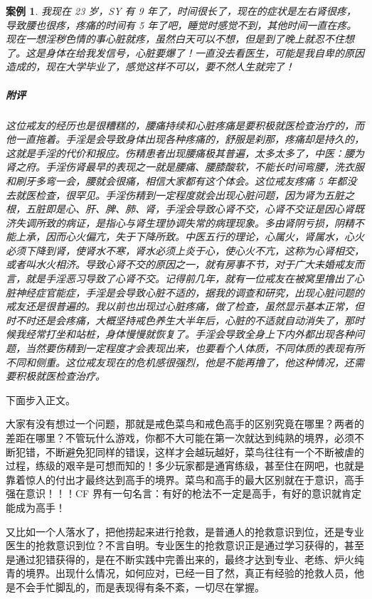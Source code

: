 \documentclass{ctexart}
\newtheorem{case}{案例}
\begin{document}
\begin{case}
    我现在 23 岁，SY 有 9 年了，时间很长了，现在的症状是左右肾很疼，导致腰也很疼，疼痛的时间有 5 年了吧，睡觉时感觉不到，其他时间一直在疼。现在一想淫秽色情的事心脏就疼，虽然白天可以不想，但是到了晚上就忍不住想了。这是身体在给我发信号，心脏要爆了！一直没去看医生，可能是我自卑的原因造成的，现在大学毕业了，感觉这样不可以，要不然人生就完了！
    \subparagraph{附评} 这位戒友的经历也是很糟糕的，腰痛持续和心脏疼痛是要积极就医检查治疗的，而他一直拖着。手淫是会导致身体出现各种疼痛的，舒服是刹那，疼痛却是持久的，这就是手淫的代价和报应。伤精患者出现腰痛极其普遍，太多太多了，中医：腰为肾之府。手淫伤肾最早的表现之一就是腰痛、腰膝酸软，不能长时间弯腰，洗衣服和刷牙多弯一会，腰就会很痛，相信大家都有这个体会。这位戒友疼痛 5 年都没去就医检查，很罕见。手淫伤精到一定程度就会出现心脏问题，因为肾为五脏之根，五脏即是心、肝、脾、肺、肾，手淫会导致心肾不交，心肾不交证是因心肾既济失调所致的病证，是指心与肾生理协调失常的病理现象。多由肾阴亏损，阴精不能上承，因而心火偏亢，失于下降所致。中医五行的理论，心属火，肾属水，心火必须下降到肾，使肾水不寒，肾水必须上炎于心，使心火不亢，这称为心肾相交，或者叫水火相济。导致心肾不交的原因之一，就有房事不节，对于广大未婚戒友而言，就是手淫恶习导致了心肾不交。记得前几年，就有一位戒友在被窝里撸出了心脏神经症官能症，手淫是会导致心脏不适的，据我的调查和研究，出现心脏问题的戒友还是很普遍的。我以前也出现过心脏疼痛，做了检查，虽然显示基本正常，但时不时还是会疼痛，大概坚持戒色养生大半年后，心脏的不适就自动消失了，那时候我经常打坐和站桩，身体慢慢就恢复了。手淫会导致全身上下内外都出现各种问题，当然要伤精到一定程度才会表现出来，也要看个人体质，不同体质的表现有所不同和侧重。这位戒友现在的危机感很强烈，他是不能再撸了，他这种情况，还需要积极就医检查治疗。
\end{case}

下面步入正文。

大家有没有想过一个问题，那就是戒色菜鸟和戒色高手的区别究竟在哪里？两者的差距在哪里？不管玩什么游戏，你都不大可能在第一次就达到纯熟的境界，必须不断犯错，不断避免犯同样的错误，这样才会越玩越好，菜鸟往往有一个不断被虐的过程，练级的艰辛是可想而知的！多少玩家都是通宵练级，甚至住在网吧，也就是靠着惊人的付出才最终达到高手的境界。菜鸟和高手的最大区别就在于意识，高手强在意识！！！CF 界有一句名言：有好的枪法不一定是高手，有好的意识就肯定能成为高手！

又比如一个人落水了，把他捞起来进行抢救，是普通人的抢救意识到位，还是专业医生的抢救意识到位？不言自明。专业医生的抢救意识正是通过学习获得的，甚至是通过犯错获得的，是在不断实践中完善出来的，最终才达到专业、老练、炉火纯青的境界。出现什么情况，如何应对，已经一目了然，真正有经验的抢救人员，他是不会手忙脚乱的，而是表现得有条不紊，一切尽在掌握。
\end{document}
